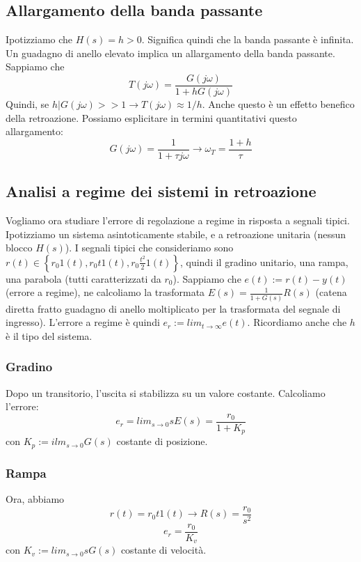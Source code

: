 \documentclass[11pt]{article}
\begin{document}
\subsection{Allargamento della banda passante}
Ipotizziamo che $H(s) = h>0$. Significa quindi che la banda passante è infinita. Un guadagno di anello elevato implica un allargamento della banda passante. Sappiamo che \begin{displaymath}
    T(j\omega) = \frac{G(j\omega)}{1+hG(j\omega)}
\end{displaymath}
Quindi, se $h|G(j\omega) >> 1 \rightarrow T(j\omega) \approx 1/h$.
Anche questo è un effetto benefico della retroazione. Possiamo esplicitare in termini quantitativi questo allargamento:
\begin{displaymath}
    G(j\omega)=\frac{1}{1+\tau j \omega} \rightarrow \omega_T = \frac{1+h}{\tau}
\end{displaymath}
\subsection{Analisi a regime dei sistemi in retroazione}
Vogliamo ora studiare l'errore di regolazione a regime in risposta a segnali tipici. Ipotizziamo un sistema asintoticamente stabile, e a retroazione unitaria (nessun blocco $H(s)$). I segnali tipici che consideriamo sono $r(t) \in \left\{r_0 1(t), r_0t1(t), r_0\frac{t^2}{2}1(t)\right\}$, quindi il gradino unitario, una rampa, una parabola (tutti caratterizzati da $r_0$). Sappiamo che $e(t) := r(t)-y(t)$ (errore a regime), ne calcoliamo la trasformata $E(s)=\frac{1}{1+G(s)}R(s)$ (catena diretta fratto guadagno di anello moltiplicato per la trasformata del segnale di ingresso). L'errore a regime è quindi $e_r := lim_{t\rightarrow\infty} e(t)$. Ricordiamo anche che $h$ è il tipo del sistema.
\subsubsection{Gradino}
Dopo un transitorio, l'uscita si stabilizza su un valore costante. Calcoliamo l'errore:
\begin{displaymath}
    e_r = lim_{s\rightarrow0} sE(s) = \frac{r_0}{1+K_p}
\end{displaymath}
con $K_p := ilm_{s\rightarrow0}G(s)$ costante di posizione.
\subsubsection{Rampa}
Ora, abbiamo
\begin{displaymath}
    r(t) = r_0 t1(t) \rightarrow R(s) = \frac{r_0}{s^2}
\end{displaymath}
\begin{displaymath}
    e_r = \frac{r_0}{K_v}
\end{displaymath}
con $K_v := lim_{s\rightarrow0}sG(s)$ costante di velocità.
\end{document}
